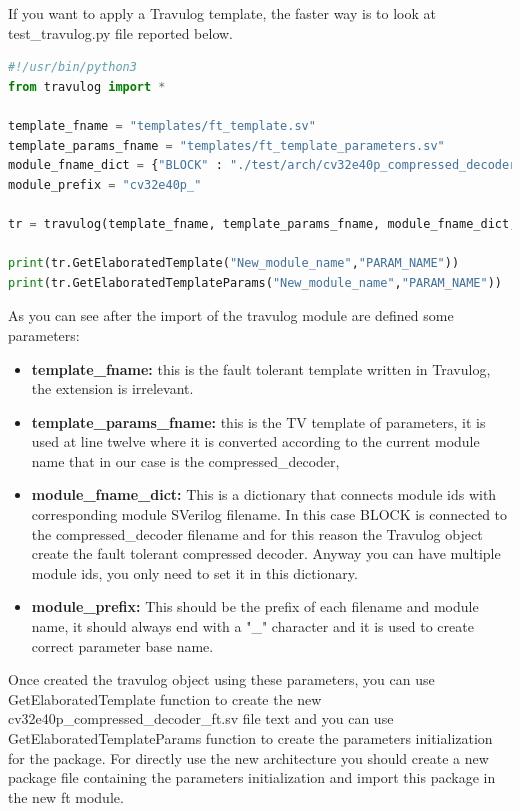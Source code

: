 {{{            If you want to apply a Travulog template, the faster way is to look at test\_travulog.py file reported below.
            \begin{lstlisting}[basicstyle=\ttfamily\scriptsize, language=Python, caption=Basic Python code to use Travulog, label=lst:texttravulog]
#!/usr/bin/python3
from travulog import *

template_fname = "templates/ft_template.sv"
template_params_fname = "templates/ft_template_parameters.sv"
module_fname_dict = {"BLOCK" : "./test/arch/cv32e40p_compressed_decoder.sv"}
module_prefix = "cv32e40p_"

tr = travulog(template_fname, template_params_fname, module_fname_dict, module_prefix)

print(tr.GetElaboratedTemplate("New_module_name","PARAM_NAME"))
print(tr.GetElaboratedTemplateParams("New_module_name","PARAM_NAME"))
            \end{lstlisting}
            
            As you can see after the import of the travulog module are defined some parameters: 
            \begin{itemize}
                \item \textbf{template\_fname:} this is the fault tolerant template written in Travulog, the extension is irrelevant.
                \item \textbf{template\_params\_fname:} this is the TV template of parameters, it is used at line twelve where it is converted according to the current module name that in our case is the compressed\_decoder,
                \item \textbf{module\_fname\_dict:} This is a dictionary that connects module ids with corresponding module SVerilog filename. In this case BLOCK is connected to the compressed\_decoder filename and for this reason the Travulog object create the fault tolerant compressed decoder. Anyway you can have multiple module ids, you only need to set it in this dictionary.
                \item \textbf{module\_prefix:} This should be the prefix of each filename and module name, it should always end with a  "\_" character and it is used to create correct parameter base name.
            \end{itemize} 
            
            Once created the travulog object using these parameters, you can use GetElaboratedTemplate function to create the new cv32e40p\_compressed\_decoder\_ft.sv file text and you can use GetElaboratedTemplateParams function to create the parameters initialization for the package.
            For directly use the new architecture you should create a new package file containing the parameters initialization and import this package in the new ft module.
        
}}}
